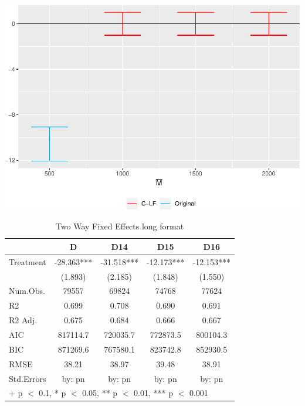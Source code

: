 \documentclass[
  12pt,
]{article}
\begin{document}
\includegraphics{Report_files/figure-latex/Figures-10.pdf}

\begin{table}

\caption{\label{tab:table-4}Two Way Fixed Effects long format}
\centering
\begin{tabular}[t]{lcccc}
\toprule
  & D & D14 & D15 & D16\\
\midrule
Treatment & -28.363*** & -31.518*** & -12.173*** & -12.153***\\
 & (1.893) & (2.185) & (1.848) & (1.550)\\
\midrule
Num.Obs. & 79557 & 69824 & 74768 & 77624\\
R2 & 0.699 & 0.708 & 0.690 & 0.691\\
R2 Adj. & 0.675 & 0.684 & 0.666 & 0.667\\
AIC & 817114.7 & 720035.7 & 772873.5 & 800104.3\\
BIC & 871269.6 & 767580.1 & 823742.8 & 852930.5\\
RMSE & 38.21 & 38.97 & 39.48 & 38.91\\
Std.Errors & by: pn & by: pn & by: pn & by: pn\\
\bottomrule
\multicolumn{5}{l}{\rule{0pt}{1em}+ p $<$ 0.1, * p $<$ 0.05, ** p $<$ 0.01, *** p $<$ 0.001}\\
\end{tabular}
\end{table}
\end{document}
